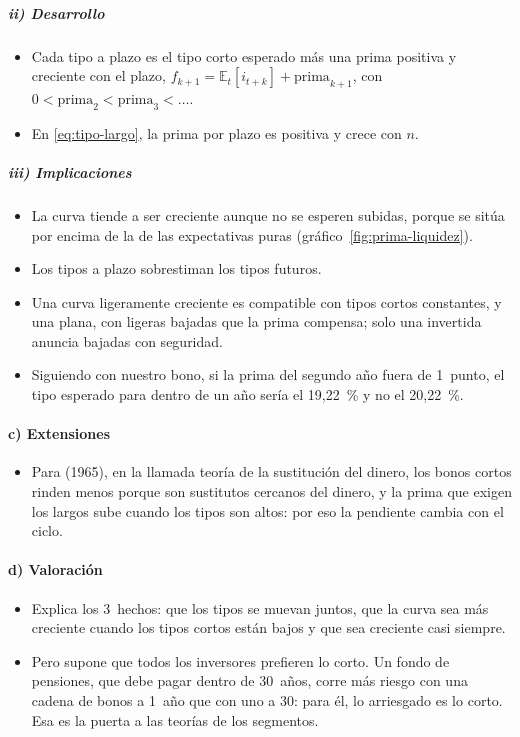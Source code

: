 \documentclass[11pt]{article}
\begin{document}
\subparagraph{ii) Desarrollo}
\begin{itemize}
\item Cada tipo a plazo es el tipo corto esperado más una prima positiva y creciente con el plazo, $f_{k+1}=\mathbb{E}_t[i_{t+k}]+\text{prima}_{k+1}$, con $0<\text{prima}_2<\text{prima}_3<\dots$.
\item En \eqref{eq:tipo-largo}, la prima por plazo es positiva y crece con $n$.
\end{itemize}

\subparagraph{iii) Implicaciones}
\begin{itemize}
\item La curva tiende a ser creciente aunque no se esperen subidas, porque se sitúa por encima de la de las expectativas puras (gráfico~\ref{fig:prima-liquidez}).
\item Los tipos a plazo sobrestiman los tipos futuros.
\item Una curva ligeramente creciente es compatible con tipos cortos constantes, y una plana, con ligeras bajadas que la prima compensa; solo una invertida anuncia bajadas con seguridad.
\item Siguiendo con nuestro bono, si la prima del segundo año fuera de 1~punto, el tipo esperado para dentro de un año sería el 19,22~\% y no el 20,22~\%.
\end{itemize}

\paragraph{c) Extensiones}
\begin{itemize}
\item Para  (1965)\nocite{Kessel1965Cyclical}, en la llamada teoría de la sustitución del dinero, los bonos cortos rinden menos porque son sustitutos cercanos del dinero, y la prima que exigen los largos sube cuando los tipos son altos: por eso la pendiente cambia con el ciclo.
\end{itemize}

\paragraph{d) Valoración}
\begin{itemize}
\item Explica los 3~hechos: que los tipos se muevan juntos, que la curva sea más creciente cuando los tipos cortos están bajos y que sea creciente casi siempre.
\item Pero supone que todos los inversores prefieren lo corto. Un fondo de pensiones, que debe pagar dentro de 30~años, corre más riesgo con una cadena de bonos a 1~año que con uno a 30: para él, lo arriesgado es lo corto. Esa es la puerta a las teorías de los segmentos.
\end{itemize}
\end{document}
